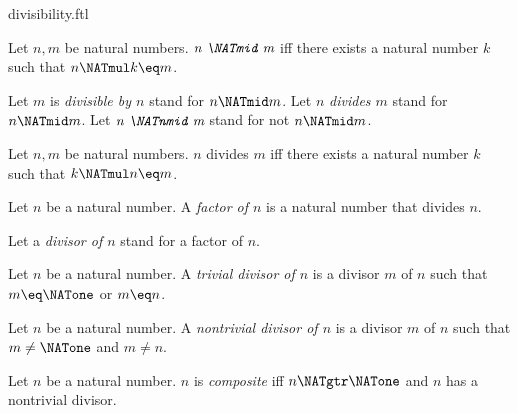\documentclass{naproche-library}
\begin{document}
\begin{smodule}[title=Divisibility]{divisibility.ftl}


\begin{definition}[forthel,id=ARITHMETIC_07_4239998993825792]
  Let $n, m$ be natural numbers.
  $\emph{n \NATmid m}$ iff there exists a natural number $k$ such that $n \NATmul k \eq m$.

  Let $m$ is \emph{divisible by $n$} stand for $n \NATmid m$.
  Let $n$ \emph{divides $m$} stand for $n \NATmid m$.
  Let $\emph{n \NATnmid m}$ stand for not $n \NATmid m$.
\end{definition}

\begin{lemma}[forthel,id=ARITHMETIC_07_1478855118290944]
  Let $n, m$ be natural numbers.
  $n$ divides $m$ iff there exists a natural number $k$ such that $k \NATmul n \eq m$.
\end{lemma}


\begin{definition}[forthel,id=ARITHMETIC_07_1311437490225152]
  Let $n$ be a natural number.
  A \emph{factor of $n$} is a natural number that divides $n$.

  Let a \emph{divisor of $n$} stand for a factor of $n$.
\end{definition}

\begin{definition}[forthel,id=ARITHMETIC_10_5438991513944064]
  Let $n$ be a natural number.
  A \emph{trivial divisor of $n$} is a divisor $m$ of $n$ such that $m \eq \NATone$ or $m \eq n$.
\end{definition}

\begin{definition}[forthel,id=ARITHMETIC_10_8768240253665280]
  Let $n$ be a natural number.
  A \emph{nontrivial divisor of $n$} is a divisor $m$ of $n$ such that $m \neq \NATone$ and $m \neq n$.
\end{definition}

\begin{definition}[forthel,id=ARITHMETIC_10_8020087063707648]
  Let $n$ be a natural number.
  $n$ is \emph{composite} iff $n \NATgtr \NATone$ and $n$ has a nontrivial divisor.
\end{definition}


\end{smodule}
\end{document}
